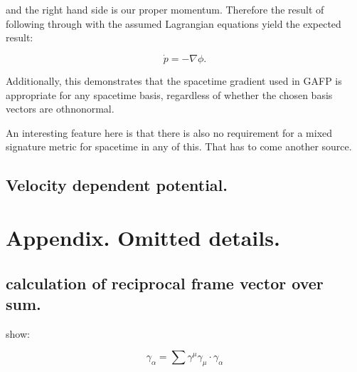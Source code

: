 \documentclass{article}
\newcommand{\grad}[0] {\nabla}
\begin{document}
and the right hand side is our proper momentum.  Therefore the result of following through with the assumed Lagrangian equations yield the expected result:

\begin{equation}
\dot{p} = -\grad \phi.
\end{equation}

Additionally, this demonstrates that the spacetime gradient used in GAFP is appropriate for any spacetime basis, regardless of whether the chosen basis vectors are othnonormal.

An interesting feature here is that there is also no requirement for a mixed signature metric for spacetime in any of this.  That has to come another source.

\subsection{ Velocity dependent potential. }

\section{ Appendix.  Omitted details. }

\subsection{ calculation of reciprocal frame vector over sum. }

show:

\begin{equation*}
\gamma_{\alpha} = \sum \gamma^{\mu} \gamma_{\mu} \cdot \gamma_{\alpha}
\end{equation*}
\end{document}
